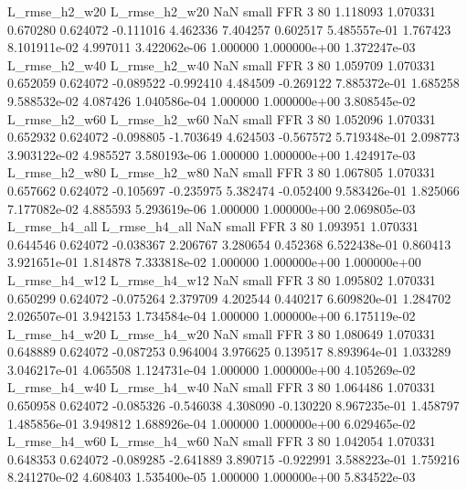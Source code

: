  L_rmse_h2_w20  L_rmse_h2_w20                   NaN      small      FFR                 3 80 1.118093       1.070331 0.670280       0.624072   -0.111016      4.462336      7.404257     0.602517   5.485557e-01  1.767423 8.101911e-02     4.997011   3.422062e-06            1.000000    1.000000e+00        1.372247e-03
 L_rmse_h2_w40  L_rmse_h2_w40                   NaN      small      FFR                 3 80 1.059709       1.070331 0.652059       0.624072   -0.089522     -0.992410      4.484509    -0.269122   7.885372e-01  1.685258 9.588532e-02     4.087426   1.040586e-04            1.000000    1.000000e+00        3.808545e-02
 L_rmse_h2_w60  L_rmse_h2_w60                   NaN      small      FFR                 3 80 1.052096       1.070331 0.652932       0.624072   -0.098805     -1.703649      4.624503    -0.567572   5.719348e-01  2.098773 3.903122e-02     4.985527   3.580193e-06            1.000000    1.000000e+00        1.424917e-03
 L_rmse_h2_w80  L_rmse_h2_w80                   NaN      small      FFR                 3 80 1.067805       1.070331 0.657662       0.624072   -0.105697     -0.235975      5.382474    -0.052400   9.583426e-01  1.825066 7.177082e-02     4.885593   5.293619e-06            1.000000    1.000000e+00        2.069805e-03
 L_rmse_h4_all  L_rmse_h4_all                   NaN      small      FFR                 3 80 1.093951       1.070331 0.644546       0.624072   -0.038367      2.206767      3.280654     0.452368   6.522438e-01  0.860413 3.921651e-01     1.814878   7.333818e-02            1.000000    1.000000e+00        1.000000e+00
 L_rmse_h4_w12  L_rmse_h4_w12                   NaN      small      FFR                 3 80 1.095802       1.070331 0.650299       0.624072   -0.075264      2.379709      4.202544     0.440217   6.609820e-01  1.284702 2.026507e-01     3.942153   1.734584e-04            1.000000    1.000000e+00        6.175119e-02
 L_rmse_h4_w20  L_rmse_h4_w20                   NaN      small      FFR                 3 80 1.080649       1.070331 0.648889       0.624072   -0.087253      0.964004      3.976625     0.139517   8.893964e-01  1.033289 3.046217e-01     4.065508   1.124731e-04            1.000000    1.000000e+00        4.105269e-02
 L_rmse_h4_w40  L_rmse_h4_w40                   NaN      small      FFR                 3 80 1.064486       1.070331 0.650958       0.624072   -0.085326     -0.546038      4.308090    -0.130220   8.967235e-01  1.458797 1.485856e-01     3.949812   1.688926e-04            1.000000    1.000000e+00        6.029465e-02
 L_rmse_h4_w60  L_rmse_h4_w60                   NaN      small      FFR                 3 80 1.042054       1.070331 0.648353       0.624072   -0.089285     -2.641889      3.890715    -0.922991   3.588223e-01  1.759216 8.241270e-02     4.608403   1.535400e-05            1.000000    1.000000e+00        5.834522e-03
